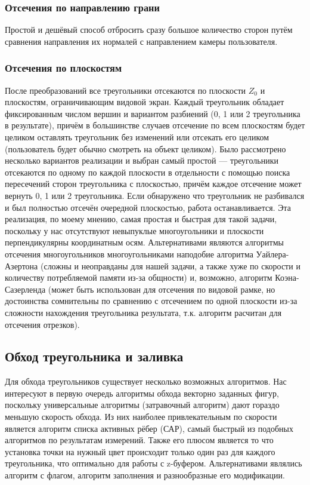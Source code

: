 \documentclass[a4paper,12pt]{report}
\begin{document}
\subsubsection{Отсечения по направлению грани}
Простой и дешёвый способ отбросить сразу большое количество сторон путём сравнения направления их нормалей с направлением камеры пользователя.

\subsubsection{Отсечения по плоскостям}
После преобразований все треугольники отсекаются по плоскости $Z_0$ и плоскостям, ограничивающим видовой экран. Каждый треугольник обладает фиксированным числом вершин и вариантом разбиений (0, 1 или 2 треугольника в результате), причём в большинстве случаев отсечение по всем плоскостям будет целиком оставлять треугольник без изменений или отсекать его целиком (пользователь будет обычно смотреть на объект целиком). Было рассмотрено несколько вариантов реализации и выбран самый простой --- треугольники отсекаются по одному по каждой плоскости в отдельности с помощью поиска пересечений сторон треугольника с плоскостью, причём каждое отсечение может вернуть 0, 1 или 2 треугольника. Если обнаружено что треугольник не разбивался и был полностью отсечён очередной плоскостью, работа останавливается. Эта реализация, по моему мнению, самая простая и быстрая для такой задачи, поскольку у нас отсутствуют невыпуклые многоугольники и плоскости перпендикулярны координатным осям. Альтернативами являются алгоритмы отсечения многоугольников многоугольниками наподобие алгоритма Уайлера-Азертона (сложны и неоправданы для нашей задачи, а также хуже по скорости и количеству потребляемой памяти из-за общности) и, возможно, алгоритм Коэна-Сазерленда (может быть использован для отсечения по видовой рамке, но достоинства сомнительны по сравнению с отсечением по одной плоскости из-за сложности нахождения треугольника результата, т.к. алгоритм расчитан для отсечения отрезков).

\subsection{Обход треугольника и заливка}
Для обхода треугольников существует несколько возможных алгоритмов. Нас интересуют в первую очередь алгоритмы обхода векторно заданных фигур, поскольку универсальные алгоритмы (затравочный алгоритм) дают гораздо меньшую скорость обхода. Из них наиболее привлекательным по скорости является алгоритм списка активных рёбер (САР), самый быстрый из подобных алгоритмов по результатам измерений. Также его плюсом является то что установка точки на нужный цвет происходит только один раз для каждого треугольника, что оптимально для работы с z-буфером. Альтернативами являлись алгоритм с флагом, алгоритм заполнения и разнообразные его модификации.
\end{document}
